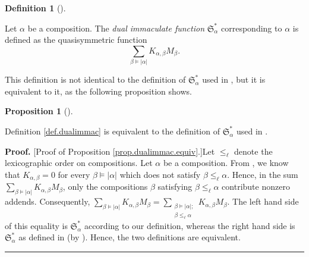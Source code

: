 \documentclass
[numbers=enddot,12pt,final,onecolumn,notitlepage,abstracton]{scrartcl}%
\theoremstyle{definition}
\newtheorem{prop}[theo]{Proposition}
\newenvironment{proposition}[1][]
{\begin{prop}[#1]\begin{leftbar}}
{\end{leftbar}\end{prop}}
\newtheorem{defi}[theo]{Definition}
\newenvironment{definition}[1][]
{\begin{defi}[#1]\begin{leftbar}}
{\end{leftbar}\end{defi}}
\newenvironment{proof}[1][Proof]{\noindent\textbf{#1.} }{\ \rule{0.5em}{0.5em}}
\newenvironment{vershort}{}{}
\let\sumnonlimits\sum
\renewcommand{\sum}{\sumnonlimits\limits}
\begin{document}
\begin{definition}
\label{def.dualimmac}Let $\alpha$ be a composition. The \textit{dual
immaculate function }$\mathfrak{S}_{\alpha}^{\ast}$ corresponding to $\alpha$
is defined as the quasisymmetric function%
\[
\sum_{\beta\models\left\vert \alpha\right\vert }K_{\alpha,\beta}M_{\beta}.
\]

\end{definition}

This definition is not identical to the definition of $\mathfrak{S}_{\alpha
}^{\ast}$ used in \cite{BBSSZ}, but it is equivalent to it, as the following
proposition shows.

\begin{proposition}
\label{prop.dualimmac.equiv}Definition \ref{def.dualimmac} is equivalent to
the definition of $\mathfrak{S}_{\alpha}^{\ast}$ used in \cite{BBSSZ}.
\end{proposition}

\begin{vershort}
\begin{proof}
[Proof of Proposition \ref{prop.dualimmac.equiv}.]Let $\leq_{\ell}$ denote the
lexicographic order on compositions. Let $\alpha$ be a composition. From
\cite[Proposition 3.15 (2)]{BBSSZ}, we know that $K_{\alpha,\beta}=0$ for
every $\beta\models\left\vert \alpha\right\vert $ which does not satisfy
$\beta\leq_{\ell}\alpha$. Hence, in the sum $\sum_{\beta\models\left\vert
\alpha\right\vert }K_{\alpha,\beta}M_{\beta}$, only the compositions $\beta$
satisfying $\beta\leq_{\ell}\alpha$ contribute nonzero addends. Consequently,
$\sum_{\beta\models\left\vert \alpha\right\vert }K_{\alpha,\beta}M_{\beta
}=\sum_{\substack{\beta\models\left\vert \alpha\right\vert ;\\\beta\leq_{\ell
}\alpha}}K_{\alpha,\beta}M_{\beta}$. The left hand side of this equality is
$\mathfrak{S}_{\alpha}^{\ast}$ according to our definition, whereas the right
hand side is $\mathfrak{S}_{\alpha}^{\ast}$ as defined in \cite{BBSSZ} (by
\cite[Proposition 3.36]{BBSSZ}). Hence, the two definitions are equivalent.
\end{proof}
\end{vershort}
\end{document}
